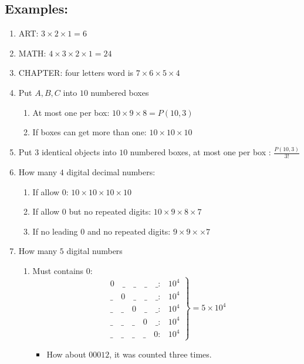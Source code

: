 \documentclass[letter]{book}
\begin{document}
\subsection*{Examples:}
\begin{enumerate}
    \item ART: $3\times 2\times 1=6$
    \item MATH: $4\times 3\times 2\times 1 = 24$
    \item CHAPTER: four letters word is $7\times 6\times 5\times 4$
    \item Put $A,B,C$ into $10$ numbered boxes
    \begin{enumerate}
        \item At most one per box: $10 \times 9\times 8=P(10,3)$
        \item If boxes can get more than one: $10\times 10 \times 10$
    \end{enumerate}
    \item Put $3$ identical objects into $10$ numbered boxes, at most one per box : $\frac{P(10,3)}{3!}$
    \item How many $4$ digital decimal numbers:
    \begin{enumerate}
        \item If allow $0$: $10\times 10\times 10\times 10$
        \item If allow $0$ but no repeated digits: $10\times 9\times 8\times 7$
        \item If no leading $0$ and no repeated digits: $9\times 9\times \times 7$
    \end{enumerate}
    \item How many $5$ digital numbers
    \begin{enumerate}
        \item Must contains $0$:\\
        $$
        \left.
            \begin{array}{ll}
            0\quad \_\quad \_\quad \_\quad \_:&10^4\\
            \_\quad 0\quad \_\quad \_\quad \_:&10^4\\
            \_\quad \_\quad 0\quad \_\quad \_:&10^4\\
            \_\quad \_\quad \_\quad 0\quad \_:&10^4\\
            \_\quad \_\quad \_\quad \_\quad 0:&10^4
            \end{array}
        \right\}
        =5\times10^4
        $$
        \begin{itemize}
            \item How about $00012$, it was counted three times.

\end{itemize}
\end{enumerate}
\end{enumerate}
\end{document}
